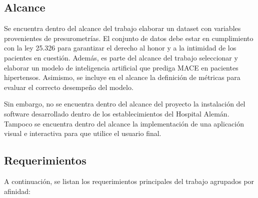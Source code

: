 \subsection{Alcance}
Se encuentra dentro del alcance del trabajo elaborar un dataset con variables provenientes de presurometrías. El conjunto 
de datos debe estar en cumplimiento con la ley 25.326 para garantizar el derecho al honor y a la intimidad de los 
pacientes en cuestión. Además, es parte del alcance del trabajo seleccionar y elaborar un modelo de inteligencia 
artificial que prediga MACE en pacientes hipertensos. Asimismo, se incluye en el alcance la definición de métricas 
para evaluar el correcto desempeño del modelo.

Sin embargo, no se encuentra dentro del alcance del proyecto la instalación del software desarrollado dentro de los 
establecimientos del Hospital Alemán. Tampoco se encuentra dentro del alcance la implementación de una aplicación 
visual e interactiva para que utilice el usuario final.


\subsection{Requerimientos}
A continuación, se listan los requerimientos principales del trabajo agrupados por afinidad:

